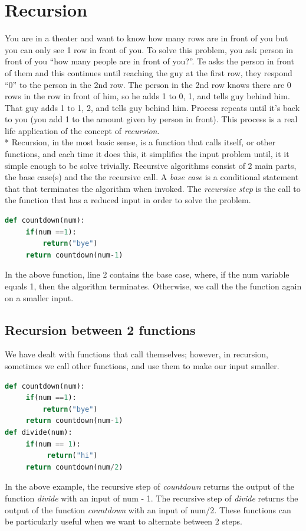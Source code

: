 \documentclass{article}
\begin{document}
\section{Recursion}
You are in a theater and want to know how many rows are in front of you but you can only see 1 row in front of you. To solve this problem, you ask person in front of you “how many people are in front of you?”. Te asks the person in front of them and this continues until reaching the guy at the first row, they respond “0” to the person in the 2nd row. The person in the 2nd row knows there are 0 rows in the row in front of him, so he adds 1 to 0, 1, and tells guy behind him. That guy adds 1 to 1, 2, and tells guy behind him. Process repeats until it’s back to you (you add 1 to the amount given by person in front). This process is a real life application of the concept of \emph{recursion}. \\*
\bigskip
Recursion, in the most basic sense, is a function that calls itself, or other functions, and each time it does this, it simplifies the input problem until, it it simple enough to be solve trivially. Recursive algorithms consist of 2 main parts, the base case(s) and the the recursive call. A \emph{base case} is a conditional statement that that terminates the algorithm when invoked. The \emph{recursive step} is the call to the function that has a reduced input in order to solve the problem.
\begin{lstlisting}[language = Python]
def countdown(num):
     if(num ==1):
         return("bye")
     return countdown(num-1)
\end{lstlisting}
In the above function, line 2 contains the base case, where, if the num variable equals 1, then the algorithm terminates. Otherwise, we call the the function again on a smaller input. 

\subsection{Recursion between 2 functions}
We have dealt with functions that call themselves; however, in recursion, sometimes we call other functions, and use them to make our input smaller.
\begin{lstlisting}[language = Python]
def countdown(num):
     if(num ==1):
         return("bye")
     return countdown(num-1)
def divide(num):
     if(num == 1):
          return("hi")
     return countdown(num/2)
\end{lstlisting}
In the above example, the recursive step of \emph{countdown} returns the output of the function \emph{divide} with an input of num - 1. The recursive step of \emph{divide} returns the output of the function \emph{countdown} with an input of num/2. These functions can be particularly useful when we want to alternate between 2 steps. 
\end{document}

